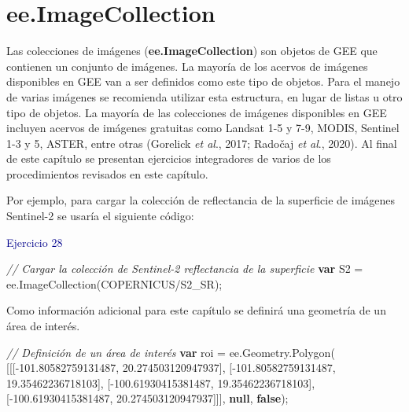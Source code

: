 \documentclass[
  12pt,
  letterpaper,
  twoside]{book}
\newenvironment{Shaded}{\begin{snugshade}}{\end{snugshade}}
\newcommand{\AttributeTok}[1]{\textcolor[rgb]{0.48,0.12,0.64}{#1}}
\newcommand{\CommentTok}[1]{\textcolor[rgb]{0.24,0.58,0.00}{\textit{#1}}}
\newcommand{\FloatTok}[1]{\textcolor[rgb]{0.28,0.53,0.93}{#1}}
\newcommand{\FunctionTok}[1]{\textcolor[rgb]{0.48,0.12,0.64}{#1}}
\newcommand{\KeywordTok}[1]{\textcolor[rgb]{0.00,0.00,0.00}{\textbf{#1}}}
\newcommand{\NormalTok}[1]{#1}
\newcommand{\OperatorTok}[1]{\textcolor[rgb]{0.00,0.00,0.00}{#1}}
\newcommand{\StringTok}[1]{\textcolor[rgb]{0.87,0.29,0.22}{#1}}
\newcommand\boldpurple[1]{\textcolor{darkpurple}{\textbf{#1}}}
\begin{document}
\newpage

\hypertarget{ee.imagecollection-1}{%
\chapter{ee.ImageCollection}\label{ee.imagecollection-1}}

Las colecciones de imágenes (\boldpurple{ee.ImageCollection}) son objetos de GEE que contienen un conjunto de imágenes. La mayoría de los acervos de imágenes disponibles en GEE van a ser definidos como este tipo de objetos. Para el manejo de varias imágenes se recomienda utilizar esta estructura, en lugar de listas u otro tipo de objetos. La mayoría de las colecciones de imágenes disponibles en GEE incluyen acervos de imágenes gratuitas como Landsat 1-5 y 7-9, MODIS, Sentinel 1-3 y 5, ASTER, entre otras (Gorelick \emph{et al}., 2017; Radočaj \emph{et al}., 2020). Al final de este capítulo se presentan ejercicios integradores de varios de los procedimientos revisados en este capítulo.

Por ejemplo, para cargar la colección de reflectancia de la superficie de imágenes Sentinel-2 se usaría el siguiente código:

\textcolor{darkblue}{Ejercicio 28}

\begin{Shaded}
\begin{Highlighting}[]
\CommentTok{// Cargar la colección de Sentinel{-}2 reflectancia de la superficie}
\KeywordTok{var}\NormalTok{ S2 }\OperatorTok{=}\NormalTok{ ee}\OperatorTok{.}\FunctionTok{ImageCollection}\NormalTok{(}\StringTok{\textquotesingle{}COPERNICUS/S2\_SR\textquotesingle{}}\NormalTok{)}\OperatorTok{;}
\end{Highlighting}
\end{Shaded}

Como información adicional para este capítulo se definirá una geometría de un área de interés.

\begin{Shaded}
\begin{Highlighting}[]
\CommentTok{// Definición de un área de interés}
\KeywordTok{var}\NormalTok{ roi }\OperatorTok{=}\NormalTok{ ee}\OperatorTok{.}\AttributeTok{Geometry}\OperatorTok{.}\FunctionTok{Polygon}\NormalTok{(}
\NormalTok{        [[[}\OperatorTok{{-}}\FloatTok{101.80582759131487}\OperatorTok{,} \FloatTok{20.274503120947937}\NormalTok{]}\OperatorTok{,}
\NormalTok{          [}\OperatorTok{{-}}\FloatTok{101.80582759131487}\OperatorTok{,} \FloatTok{19.35462236718103}\NormalTok{]}\OperatorTok{,}
\NormalTok{          [}\OperatorTok{{-}}\FloatTok{100.61930415381487}\OperatorTok{,} \FloatTok{19.35462236718103}\NormalTok{]}\OperatorTok{,}
\NormalTok{          [}\OperatorTok{{-}}\FloatTok{100.61930415381487}\OperatorTok{,} \FloatTok{20.274503120947937}\NormalTok{]]]}\OperatorTok{,} \KeywordTok{null}\OperatorTok{,} \KeywordTok{false}\NormalTok{)}\OperatorTok{;}
\end{Highlighting}
\end{Shaded}
\end{document}
